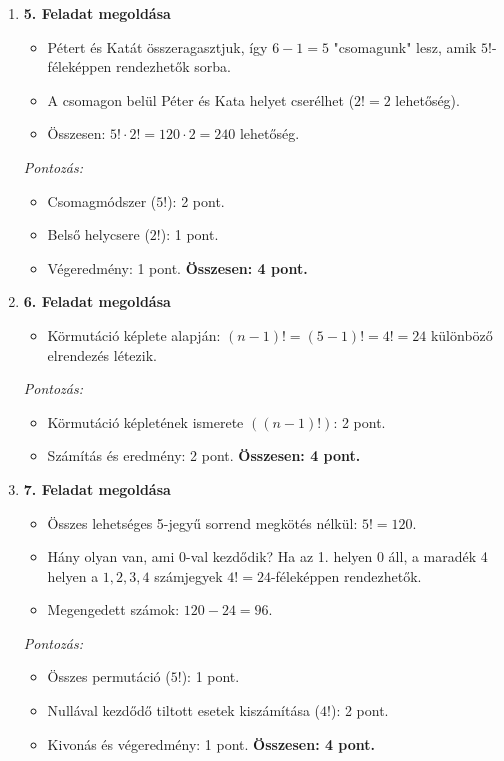 \documentclass[12pt,a4paper]{article}
\begin{document}
\begin{enumerate}
    \item \textbf{5. Feladat megoldása}
    \begin{itemize}
        \item Pétert és Katát összeragasztjuk, így $6-1 = 5$ "csomagunk" lesz, amik $5!$-féleképpen rendezhetők sorba.
        \item A csomagon belül Péter és Kata helyet cserélhet ($2! = 2$ lehetőség).
        \item Összesen: $5! \cdot 2! = 120 \cdot 2 = 240$ lehetőség.
    \end{itemize}
    \emph{Pontozás:}
    \begin{itemize}
        \item Csomagmódszer ($5!$): 2 pont.
        \item Belső helycsere ($2!$): 1 pont.
        \item Végeredmény: 1 pont.
        \textbf{Összesen: 4 pont.}
    \end{itemize}

    \vspace{0.3cm}

    \item \textbf{6. Feladat megoldása}
    \begin{itemize}
        \item Körmutáció képlete alapján: $(n-1)! = (5-1)! = 4! = 24$ különböző elrendezés létezik.
    \end{itemize}
    \emph{Pontozás:}
    \begin{itemize}
        \item Körmutáció képletének ismerete $((n-1)!)$: 2 pont.
        \item Számítás és eredmény: 2 pont.
        \textbf{Összesen: 4 pont.}
    \end{itemize}

    \vspace{0.3cm}

    \item \textbf{7. Feladat megoldása}
    \begin{itemize}
        \item Összes lehetséges 5-jegyű sorrend megkötés nélkül: $5! = 120$.
        \item Hány olyan van, ami 0-val kezdődik? Ha az 1. helyen 0 áll, a maradék 4 helyen a $1, 2, 3, 4$ számjegyek $4! = 24$-féleképpen rendezhetők.
        \item Megengedett számok: $120 - 24 = 96$.
    \end{itemize}
    \emph{Pontozás:}
    \begin{itemize}
        \item Összes permutáció ($5!$): 1 pont.
        \item Nullával kezdődő tiltott esetek kiszámítása ($4!$): 2 pont.
        \item Kivonás és végeredmény: 1 pont.
        \textbf{Összesen: 4 pont.}
    \end{itemize}


\end{enumerate}
\end{document}
